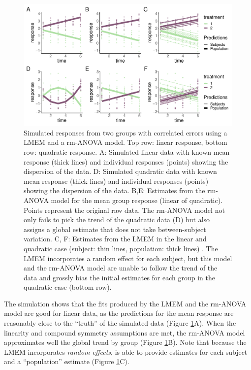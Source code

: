 \documentclass[
]{article}
\begin{document}
\begin{figure}

{\centering \includegraphics[width=1\linewidth]{SIM_Appendix_files/figure-latex/l-q-response-1} 

}

\caption{Simulated responses from two groups with correlated errors using a LMEM and a rm-ANOVA model. Top row: linear response, bottom row: quadratic response. A: Simulated linear data with known mean response (thick lines) and individual responses (points) showing the dispersion of the data. D: Simulated quadratic data with known mean response (thick lines) and individual responses (points) showing the dispersion of the data. B,E: Estimates from the rm-ANOVA model for the mean group response (linear of quadratic). Points represent the original raw data. The rm-ANOVA model not only fails to pick the trend of the quadratic data (D) but also assigns a global estimate that does not take between-subject variation. C, F: Estimates from the LMEM in the linear and quadratic case (subject: thin lines, population: thick lines) . The LMEM incorporates a random effect for each subject, but this model and the rm-ANOVA model are unable to follow the trend of the data and grossly bias the initial estimates for each group in the quadratic case (bottom row).}\label{fig:l-q-response}
\end{figure}

The simulation shows that the fits produced by the LMEM and the rm-ANOVA model are good for linear data, as the predictions for the mean response are reasonably close to the ``truth'' of the simulated data (Figure \ref{fig:l-q-response}A). When the linearity and compound symmetry assumptions are met, the rm-ANOVA model approximates well the global trend by group (Figure \ref{fig:l-q-response}B). Note that because the LMEM incorporates \emph{random effects}, is able to provide estimates for each subject and a ``population'' estimate (Figure \ref{fig:l-q-response}C).
\end{document}
